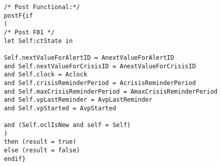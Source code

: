 	\scriptsize
	\vspace{0.5cm}
	\begin{lstlisting}[style=MessirStyle,firstnumber=auto,captionpos=b,caption={\msrmessir (MCL-oriented) specification of the operation \emph{init}.},label=OM-ctState-init-MCL-LST]

	
	
	/* Post Functional:*/ 
	postF{if
	(
	/* Post F01 */
	let Self:ctState in
	
	Self.nextValueForAlertID = AnextValueForAlertID
	and Self.nextValueForCrisisID = AnextValueForCrisisID
	and Self.clock = Aclock
	and Self.crisisReminderPeriod = AcrisisReminderPeriod
	and Self.maxCrisisReminderPeriod = AmaxCrisisReminderPeriod
	and Self.vpLastReminder = AvpLastReminder
	and Self.vpStarted = AvpStarted
	
	and (Self.oclIsNew and self = Self)
	)
	then (result = true)
	else (result = false)
	endif}
	
	
	\end{lstlisting}
	\normalsize 
	
	
	
	





